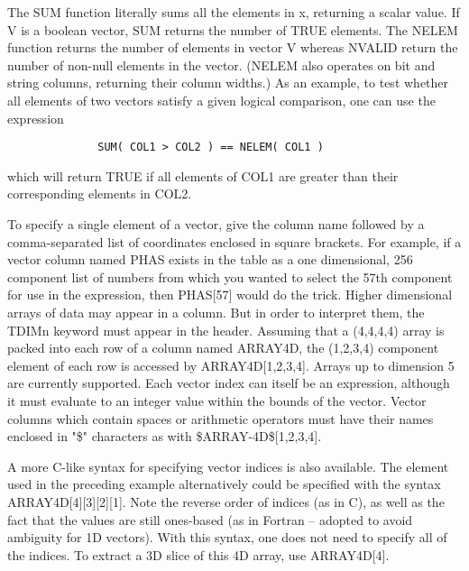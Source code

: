 \documentclass[11pt]{book}
\begin{document}
    The SUM function literally sums all  the elements in x,  returning a
    scalar value.   If V  is  a  boolean  vector, SUM returns the number
    of TRUE elements. The NELEM function  returns the number of elements
    in vector V whereas NVALID return the number of non-null elements in
    the  vector.   (NELEM  also  operates  on  bit  and string  columns,
    returning their column widths.)  As an example, to  test whether all
    elements of two vectors satisfy a  given logical comparison, one can
    use the expression

\begin{verbatim}
              SUM( COL1 > COL2 ) == NELEM( COL1 )
\end{verbatim}

    which will return TRUE if all elements  of  COL1  are  greater  than
    their corresponding elements in COL2.

    To  specify  a  single  element  of  a  vector, give the column name
    followed by  a  comma-separated  list  of  coordinates  enclosed  in
    square  brackets.  For example, if a vector column named PHAS exists
    in the table as a one dimensional, 256  component  list  of  numbers
    from  which  you  wanted to select the 57th component for use in the
    expression, then PHAS[57] would do the  trick.   Higher  dimensional
    arrays  of  data  may appear in a column.  But in order to interpret
    them, the TDIMn keyword must appear in the header.  Assuming that  a
    (4,4,4,4)  array  is packed into each row of a column named ARRAY4D,
    the  (1,2,3,4)  component  element  of  each  row  is  accessed   by
    ARRAY4D[1,2,3,4].    Arrays   up   to   dimension  5  are  currently
    supported.  Each vector index can itself be an expression,  although
    it  must  evaluate  to  an  integer  value  within the bounds of the
    vector.  Vector columns which contain spaces or arithmetic operators
    must   have   their   names  enclosed  in  "\$"  characters  as  with
    \$ARRAY-4D\$[1,2,3,4].

    A  more  C-like  syntax  for  specifying  vector  indices  is   also
    available.   The element used in the preceding example alternatively
    could be specified with the syntax  ARRAY4D[4][3][2][1].   Note  the
    reverse  order  of  indices  (as in C), as well as the fact that the
    values are still ones-based (as  in  Fortran  --  adopted  to  avoid
    ambiguity  for  1D vectors).  With this syntax, one does not need to
    specify all of the indices.  To  extract  a  3D  slice  of  this  4D
    array, use ARRAY4D[4].
\end{document}
